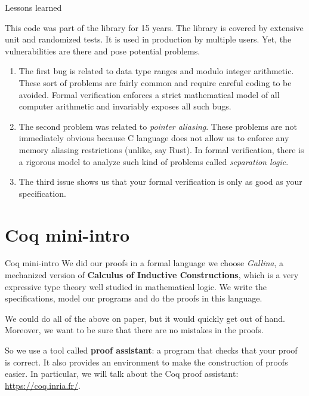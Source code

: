 \documentclass[10pt]{beamer}
\begin{document}
\begin{frame}{Lessons learned}

This code was part of the library for 15 years. The library is covered by extensive unit and randomized tests. It is used in production by multiple users. Yet, the vulnerabilities are there and pose potential problems.

\begin{enumerate}
    \item The first bug is related to data type ranges and modulo integer arithmetic. These sort of problems are fairly common and require careful coding to be avoided. Formal verification enforces a strict mathematical model of all computer arithmetic and invariably exposes all such bugs.
    \item The second problem was related to \textit{pointer aliasing}. These problems are not immediately obvious because C language does not allow us to enforce any memory aliasing restrictions (unlike, say Rust). In formal verification, there is a rigorous model to analyze such kind of problems called \textit{separation logic}.
    \item The third issue shows us that your formal verification is only as good as your specification.
\end{enumerate}

\end{frame}

\section{Coq mini-intro}

\begin{frame}{Coq mini-intro}
  We did our proofs in a formal language we choose {\it Gallina}, a mechanized version of {\bf Calculus of Inductive Constructions}, which is a very expressive type theory well studied in mathematical logic. We write the specifications, model our programs and do the proofs in this language.

  \smallskip
We could do all of the above on paper, but it would quickly get out of hand. Moreover, we want to be sure that there are no mistakes in the proofs.
  
  So we use a tool called {\bf proof assistant}: a program that checks that your proof is correct. It also provides an environment to make the construction of proofs easier. In particular, we will talk about the Coq proof assistant: \url{https://coq.inria.fr/}.
  
  
\end{frame}
\end{document}
